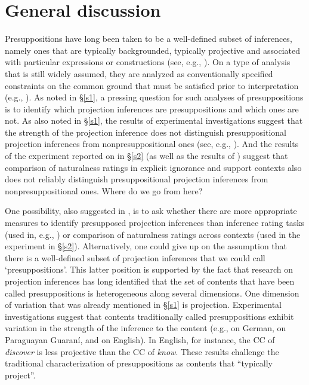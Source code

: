 \documentclass[11pt,fleqn]{article}
\newcommand{\6}{\mbox{$[\hspace*{-.6mm}[$}}
\newcommand{\9}{\mbox{$]\hspace*{-.6mm}]$}}
\begin{document}
  
\section{General discussion}\label{s3}

Presuppositions have long been taken to be a well-defined subset of inferences, namely ones that are typically backgrounded, typically projective and associated with particular expressions or constructions (see, e.g., \citealt{potts05,presupposition-sep}). On a type of analysis that is still widely assumed, they are analyzed as conventionally specified constraints on the common ground that must be satisfied prior to interpretation (e.g., \citealt{heim83,vds92}). As noted in \S\ref{s1}, a pressing question for such analyses of presuppositions is to identify which projection inferences are presuppositions and which ones are not. As also noted in \S\ref{s1}, the results of experimental investigations suggest that the strength of the projection inference does not distinguish presuppositional projection inferences from nonpresuppositional ones (see, e.g., \citealt{demarneffe-etal-sub23,tbd-variability,degen-tonhauser-language}). And the results of the experiment reported on in \S\ref{s2} (as well as the results of \citealt[Exp.~1]{kalomoiros-schwarz2024}) suggest that comparison of naturalness ratings in explicit ignorance and support contexts also does not reliably distinguish presuppositional projection inferences from nonpresuppositional ones. Where do we go from here?

One possibility, also suggested in \citealt[\S4]{degen-tonhauser-language}, is to ask whether there are more appropriate measures to identify presupposed projection inferences than inference rating tasks (used in, e.g., \citealt{degen-tonhauser-language}) or comparison of naturalness ratings across contexts (used in the experiment in \S\ref{s2}). Alternatively, one could give up on the assumption that there is a well-defined subset of projection inferences that we could call `presuppositions'. This latter position is supported by the fact that research on projection inferences has long identified that the set of contents that have been called presuppositions is heterogeneous along several dimensions. One dimension of variation that was already mentioned in \S\ref{s1} is projection. Experimental investigations suggest that contents traditionally called presuppositions exhibit variation in the strength of the inference to the content (e.g., \citealt{xue-onea11} on German, \citealt{tonhauser-guarani-variability} on Paraguayan Guaran\'i, and \citealt{demarneffe-etal-sub23,tbd-variability,degen-tonhauser-language} on English). In English, for instance, the CC of {\em discover} is less projective than the CC of {\em know}. These results challenge the traditional characterization of presuppositions as contents that ``typically project''.
\end{document}
